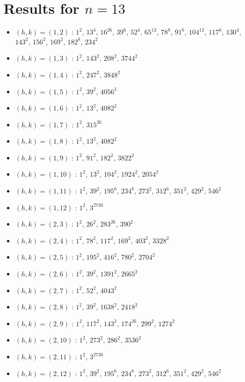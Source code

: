 \section{Results for $n=13$}
\begin{itemize}
\item $(h,k)=(1,2)$ : $1^{2}$, $13^{4}$, $16^{26}$, $39^{6}$, $52^{4}$, $65^{12}$, $78^{8}$, $91^{6}$, $104^{12}$, $117^{6}$, $130^{4}$, $143^{2}$, $156^{2}$, $169^{2}$, $182^{8}$, $234^{2}$
\item $(h,k)=(1,3)$ : $1^{2}$, $143^{2}$, $208^{2}$, $3744^{2}$
\item $(h,k)=(1,4)$ : $1^{2}$, $247^{2}$, $3848^{2}$
\item $(h,k)=(1,5)$ : $1^{2}$, $39^{2}$, $4056^{2}$
\item $(h,k)=(1,6)$ : $1^{2}$, $13^{2}$, $4082^{2}$
\item $(h,k)=(1,7)$ : $1^{2}$, $315^{26}$
\item $(h,k)=(1,8)$ : $1^{2}$, $13^{2}$, $4082^{2}$
\item $(h,k)=(1,9)$ : $1^{2}$, $91^{2}$, $182^{2}$, $3822^{2}$
\item $(h,k)=(1,10)$ : $1^{2}$, $13^{2}$, $104^{2}$, $1924^{2}$, $2054^{2}$
\item $(h,k)=(1,11)$ : $1^{2}$, $39^{2}$, $195^{6}$, $234^{8}$, $273^{2}$, $312^{6}$, $351^{2}$, $429^{2}$, $546^{2}$
\item $(h,k)=(1,12)$ : $1^{2}$, $3^{2730}$
\item $(h,k)=(2,3)$ : $1^{2}$, $26^{2}$, $283^{26}$, $390^{2}$
\item $(h,k)=(2,4)$ : $1^{2}$, $78^{2}$, $117^{2}$, $169^{2}$, $403^{2}$, $3328^{2}$
\item $(h,k)=(2,5)$ : $1^{2}$, $195^{2}$, $416^{2}$, $780^{2}$, $2704^{2}$
\item $(h,k)=(2,6)$ : $1^{2}$, $39^{2}$, $1391^{2}$, $2665^{2}$
\item $(h,k)=(2,7)$ : $1^{2}$, $52^{2}$, $4043^{2}$
\item $(h,k)=(2,8)$ : $1^{2}$, $39^{2}$, $1638^{2}$, $2418^{2}$
\item $(h,k)=(2,9)$ : $1^{2}$, $117^{2}$, $143^{2}$, $174^{26}$, $299^{2}$, $1274^{2}$
\item $(h,k)=(2,10)$ : $1^{2}$, $273^{2}$, $286^{2}$, $3536^{2}$
\item $(h,k)=(2,11)$ : $1^{2}$, $3^{2730}$
\item $(h,k)=(2,12)$ : $1^{2}$, $39^{2}$, $195^{6}$, $234^{8}$, $273^{2}$, $312^{6}$, $351^{2}$, $429^{2}$, $546^{2}$

\end{itemize}
